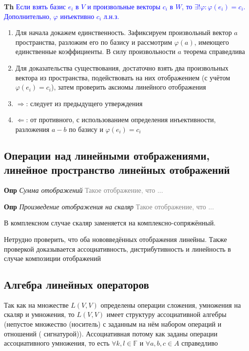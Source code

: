 \textbf{Th} \textcolor{blue}{Если взять базис $e_i$ в $V$ и произвольные векторы $c_i$ в $W$, то
    $\exists ! \varphi: \varphi(e_i) = c_i$. Дополнительно, $\varphi$ инъективно $c_i$ л.н.з.}

\begin{enumerate}
    \item Для начала докажем единственность.
    Зафиксируем произвольный вектор $a$ пространства, разложим его по базису и рассмотрим $\varphi (a)$, имеющего
    единственные коэффициенты.
    В силу произвольности $a$ теорема справедлива
    \item Для доказательства существования, достаточно взять два произвольных вектора из пространства,
    подействовать на них отображением (с учётом $\varphi(e_i) = c_i$), затем проверить аксиомы линейного отображения
    \item $\Rightarrow$: следует из предыдущего утверждения
    \item $\Leftarrow$: от противного, с использованием определения инъективности, разложения $a - b$ по базису и
    $\varphi(e_i) = c_i$
\end{enumerate}

\subsection{Операции над линейными отображениями, линейное пространство линейных отображений}

\textbf{Опр} \textit{Сумма отображений} \textcolor{gray}{Такое отображение, что ...}

\textbf{Опр} \textit{Произведение отображения на скаляр} \textcolor{gray}{Такое отображение, что ...}

В комплексном случае скаляр заменяется на комплексно-сопряжённый.

Нетрудно проверить, что оба нововведённых отображения линейны.
Также проверкой доказывается ассоциативность, дистрибутивность и линейность в случае композиции отображений

\subsection{Алгебра линейных операторов}

Так как на множестве $L(V, V)$ определены операции сложения, умножения на скаляр и умножения, то $L(V, V)$ имеет
структуру ассоциативной алгебры (непустое множество (носитель) с заданным на нём набором операций и отношений (
сигнатурой)).
Ассоциативная потому как заданы операции ассоциативного умножения, то есть $\forall k, l \in \mathbb{F}$ и
$\forall a, b, c \in A$ справедливо

